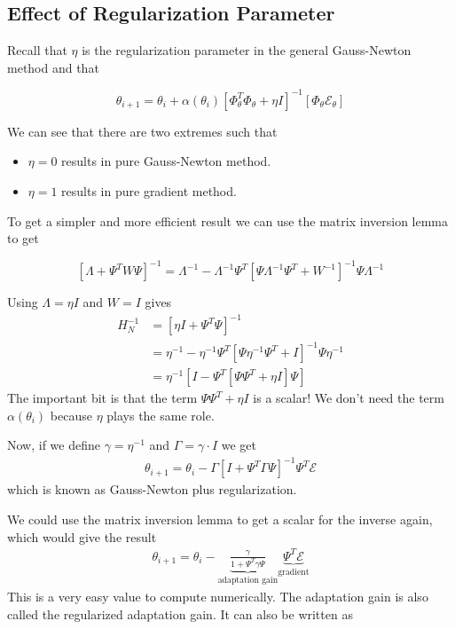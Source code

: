 \subsection{Effect of Regularization Parameter}
Recall that $\eta$ is the regularization parameter in the general Gauss-Newton method and that

\begin{equation*}
\theta_{i+1} = \theta_i+\alpha(\theta_i){\left[\Phi_\theta^T\Phi_\theta + \eta I\right]}^{-1}\left[\Phi_\theta\mathcal{E}_\theta\right]
\end{equation*}

We can see that there are two extremes such that
\begin{itemize}
\item $\eta=0$ results in pure Gauss-Newton method.
\item $\eta=1$ results in pure gradient method.
\end{itemize}
To get a simpler and more efficient result we can use the matrix inversion lemma to get

\begin{equation*}
{\left[\Lambda+\Psi^T W\Psi\right]}^{-1} = \Lambda^{-1} - \Lambda^{-1}\Psi^T{\left[\Psi\Lambda^{-1}\Psi^T + W^{-1}\right]}^{-1}\Psi\Lambda^{-1}
\end{equation*}

Using $\Lambda=\eta I$ and $W=I$ gives
\begin{align*}
H_N^{-1} &= {\left[\eta I + \Psi^T\Psi\right]}^{-1} \\
&= \eta^{-1}-\eta^{-1}\Psi^T{\left[\Psi\eta^{-1}\Psi^T+I\right]}^{-1}\Psi\eta^{-1} \\
&= \eta^{-1}\left[I-\Psi^T\left[\Psi\Psi^T+\eta I\right]\Psi\right]
\end{align*}
The important bit is that the term $\Psi\Psi^T+\eta I$ is a scalar! We don't need the term $\alpha(\theta_i)$ because $\eta$ plays the same role.

Now, if we define $\gamma=\eta^{-1}$ and $\Gamma=\gamma\cdot I$ we get
\begin{align*}
\boxed{\theta_{i+1} = \theta_i - \Gamma{\left[I+\Psi^T\Gamma\Psi\right]}^{-1}\Psi^T\mathcal{E}}
\end{align*}
which is known as Gauss-Newton plus regularization.

We could use the matrix inversion lemma to get a scalar for the inverse again, which would give the result
\begin{align*}
\boxed{\theta_{i+1} = \theta_i - \underbrace{\frac{\gamma}{1+\Psi^T\gamma\Psi}}_{\text{adaptation gain}}\underbrace{\Psi^T\mathcal{E}}_{\text{gradient}}}
\end{align*}
This is a very easy value to compute numerically.
The adaptation gain is also called the regularized adaptation gain.
It can also be written as

